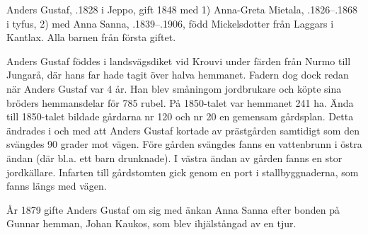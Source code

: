%
Anders Gustaf, .1828 i Jeppo, gift 1848 med 1) Anna-Greta Mietala, .1826--.1868 i tyfus, 2) med Anna Sanna, .1839--.1906, född Mickelsdotter från Laggars i Kantlax. Alla barnen från första giftet.
\begin{jhchildren}
  \item {}
  \item {}
  \item {}
  \item {}
  \item {}
  \item {}
  \item {}
  \item {}
  \item {}
\end{jhchildren}
Anders Gustaf föddes i landsvägsdiket vid Krouvi under färden från Nurmo till Jungarå, där hans far hade tagit över halva hemmanet. Fadern dog dock redan när Anders Gustaf var 4 år. Han blev småningom jordbrukare och köpte sina bröders hemmansdelar för 785 rubel. På 1850-talet var hemmanet 241 ha. Ända till 1850-talet bildade gårdarna nr 120 och nr 20 en gemensam gårdsplan. Detta ändrades i och med att Anders Gustaf kortade av prästgården samtidigt som den svängdes 90 grader mot vägen. Före gården svängdes fanns en vattenbrunn i östra ändan (där bl.a. ett barn drunknade). I västra ändan av gården fanns en stor jordkällare. Infarten till gårdstomten gick genom en port i stallbyggnaderna, som fanns längs med vägen.

År 1879 gifte Anders Gustaf om sig med änkan Anna Sanna efter bonden på Gunnar hemman, Johan Kaukos, som blev ihjälstångad av en tjur.

